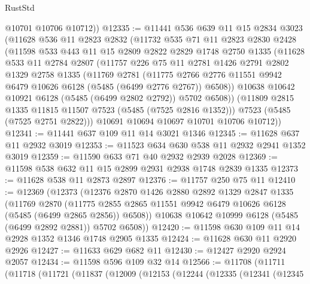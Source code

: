 \begin{lexlean}{RustStd}
\begin{coremodule}
        @10701
        @10706
        @10712))
@12335 := @11441
    @536
    @639
    @11
    @15
    @2834
    @3023
    (@11628
      @536
      @11
      @2823
      @2832
      (@11732
        @535
        @71
        @11
        @2823
        @2830
        @2428
        (@11598
          @533
          @443
          @11
          @15
          @2809
          @2822
          @2829
          @1748
          @2750
          @1335
          (@11628
            @533
            @11
            @2784
            @2807
            (@11757
              @226
              @75
              @11
              @2781
              @1426
              @2791
              @2802
              @1329
              @2758
              @1335
              (@11769
                @2781
                (@11775
                  @2766
                  @2776
                  @11551
                  @9942
                  @6479
                  @10626
                  @6128
                  (@5485 (@6499 @2776 @2767))
                  @6508))
              @10638
              @10642
              @10921
              @6128
              (@5485 (@6499 @2802 @2792))
              @5702
              @6508))
          (@11809 @2815 @1335 @11815 @11507 @7523 (@5485 (@7525 @2816 @1352)))
          @7523
          (@5485 (@7525 @2751 @2822)))
        @10691
        @10694
        @10697
        @10701
        @10706
        @10712))
@12341 := @11441 @637 @109 @11 @14 @3021 @1346
@12345 := @11628 @637 @11 @2932 @3019
@12353 := @11523 @634 @630 @538 @11 @2932 @2941 @1352 @3019
@12359 := @11590 @633 @71 @40 @2932 @2939 @2028
@12369 := @11598 @538 @632 @11 @15 @2899 @2931 @2938 @1748 @2839 @1335
@12373 := @11628 @538 @11 @2873 @2897
@12376 := @11757 @250 @75 @11
@12410 := @12369
    (@12373
      (@12376
        @2870
        @1426
        @2880
        @2892
        @1329
        @2847
        @1335
        (@11769
          @2870
          (@11775 @2855 @2865 @11551 @9942 @6479 @10626 @6128 (@5485 (@6499 @2865 @2856)) @6508))
        @10638
        @10642
        @10999
        @6128
        (@5485 (@6499 @2892 @2881))
        @5702
        @6508))
@12420 := @11598 @630 @109 @11 @14 @2928 @1352 @1346 @1748 @2905 @1335
@12424 := @11628 @630 @11 @2920 @2926
@12427 := @11633 @629 @682 @11
@12430 := @12427 @2920 @2924 @2057
@12434 := @11598 @596 @109 @32 @14
@12566 := @11708
    (@11711
      (@11718
        (@11721
          (@11837
            (@12009
              (@12153
                (@12244
                  (@12335
                    (@12341
                      (@12345

\end{coremodule}
\end{lexlean}

